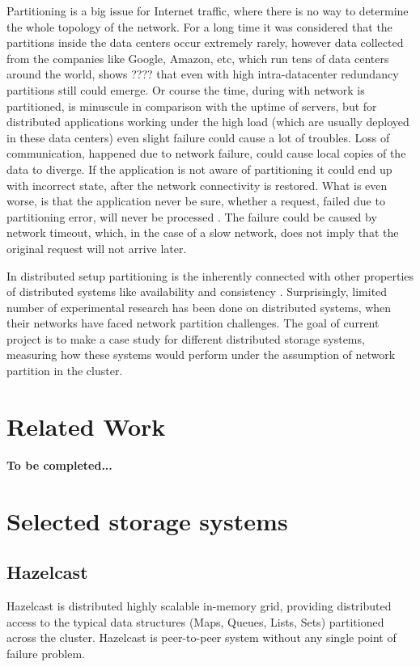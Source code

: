 \documentclass[a4paper]{article}
\begin{document}
Partitioning is a big issue for Internet traffic, where there is no way to determine the whole topology of the network.
For a long time it was considered that the partitions inside the data centers occur extremely rarely, however data collected from the companies like Google, Amazon, etc, which run tens of data centers around the world, shows ???? that even with high intra-datacenter redundancy partitions still could emerge.
Or course the time, during with network is partitioned, is minuscule in comparison with the uptime of servers, but for distributed applications working under the high load (which are usually deployed in these data centers) even slight failure could cause a lot of troubles.
Loss of communication, happened due to network failure, could cause local copies of the data to diverge.
If the application is not aware of partitioning it could end up with incorrect state, after the network connectivity is restored.
What is even worse, is that the application never be sure, whether a request, failed due to partitioning error, will never be processed . 
The failure could be caused by network timeout, which, in the case of a slow network, does not imply that the original request will not arrive later.

In distributed setup partitioning is the inherently connected with other properties of distributed systems like availability and consistency \cite{brewer2000towards}.
Surprisingly, limited number of experimental research has been done on distributed systems, when their networks have faced network partition challenges. 
The goal of current project is to make a case study for different distributed storage systems, measuring how these systems would perform under the assumption of network partition in the cluster.


\section{Related Work}

{\bf To be completed...}



\section{Selected storage systems}
\label{sec:candidates}

\subsection*{Hazelcast}
Hazelcast is distributed highly scalable in-memory grid, providing distributed access to the typical data structures (Maps, Queues, Lists, Sets) partitioned across the cluster. 
Hazelcast is peer-to-peer system without any single point of failure problem.
\end{document}

